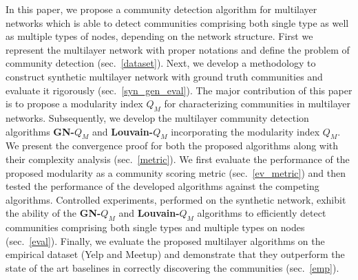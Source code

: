 
In this paper, we propose a community detection algorithm for multilayer networks
which is able to detect communities comprising both single type as well as multiple types of nodes,
depending on the network structure. First we represent the multilayer network with proper notations and define
the problem of community detection (sec.~\ref{dataset}). Next, we develop a methodology to construct synthetic multilayer network
with ground truth communities and evaluate it rigorously (sec.~\ref{syn_gen_eval}). The major contribution of this paper is to propose a
modularity index $Q_M$ for characterizing communities in multilayer networks. Subsequently, we develop the multilayer community detection
algorithms \textbf{GN-$Q_M$} and \textbf{Louvain-$Q_M$} incorporating the modularity index $Q_M$. We present the convergence proof for both 
the proposed algorithms along with their complexity analysis (sec.~\ref{metric}).
We first evaluate the performance of the proposed modularity as a community scoring metric (sec.~\ref{ev_metric}) and then tested
the performance of the developed algorithms
against the competing algorithms.
Controlled experiments, performed on
the synthetic network, exhibit the ability of the \textbf{GN-$Q_M$} and \textbf{Louvain-$Q_M$} algorithms to
efficiently detect communities comprising both single types and multiple types on nodes (sec.~\ref{eval}). Finally,
we evaluate the proposed multilayer algorithms on the empirical dataset (Yelp and Meetup) and 
demonstrate that they outperform the state of the art baselines in correctly discovering the communities (sec.~\ref{emp}).
